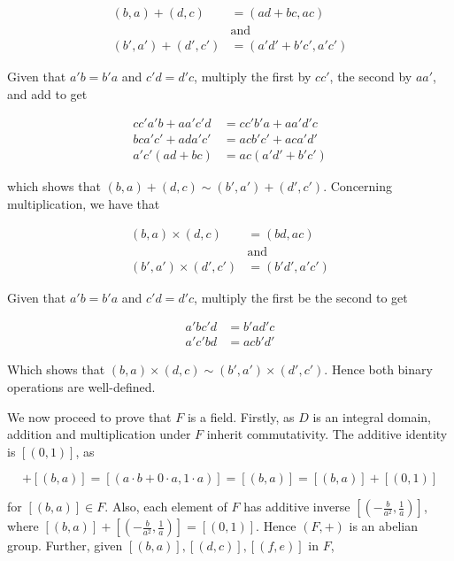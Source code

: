 \documentclass{article}
\begin{document}
\begin{align*}
    (b, a) + (d, c) &= (ad + bc, ac)\\
    &\text{and}\\
    (b', a') + (d', c') &= (a'd' + b'c', a'c')
\end{align*}

Given that $a'b = b'a$ and $c'd = d'c$, multiply the first by $cc'$,
the second by $aa'$, and add to get 

\begin{align*}
    cc'a'b + aa'c'd &= cc'b'a + aa'd'c\\
    bca'c' + ada'c' &= acb'c' + aca'd'\\
    a'c'(ad + bc) &= ac(a'd' + b'c')
\end{align*}

which shows that $(b, a) + (d, c) \sim (b', a') + (d', c')$. Concerning
multiplication, we have that

\begin{align*}
    (b, a) \times (d, c) &= (bd, ac)\\
    &\text{and}\\
    (b', a') \times (d', c') &= (b'd', a'c')
\end{align*}

Given that $a'b = b'a$ and $c'd = d'c$, multiply the first be the second
to get

\begin{align*}
    a'bc'd &= b'ad'c\\
    a'c'bd &= acb'd'
\end{align*}

Which shows that $(b, a) \times (d, c) \sim (b', a') \times (d', c')$. Hence both
binary operations are well-defined.

\hfill\break
We now proceed to prove that $F$ is a field. Firstly, as $D$ is an integral domain,
addition and multiplication under $F$ inherit commutativity. The additive identity
is $[(0, 1)]$, as

\begin{equation*}
    [(0, 1)] + [(b, a)] = [(a\cdot b + 0\cdot a, 1\cdot a)] = [(b, a)]
        = [(b, a)] + [(0, 1)]
\end{equation*}

for $[(b, a)] \in F$. Also, each element of $F$ has additive inverse
$[(-\frac{b}{a^2}, \frac{1}{a})]$, where $[(b, a)] + [(-\frac{b}{a^2}, \frac{1}{a})] = [(0, 1)]$.
Hence $(F, +)$ is an abelian group. Further, given $[(b, a)], [(d, c)], [(f, e)]$ in $F$,
\end{document}
